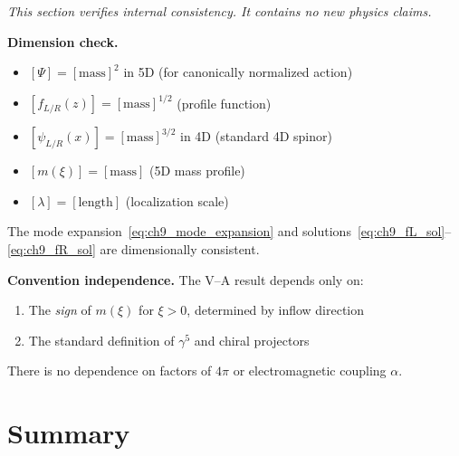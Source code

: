 \begin{tcolorbox}[colback=gray!5!white, colframe=gray!60!black,
    title=\textbf{Consistency Check (Not a Derivation)}]
\emph{This section verifies internal consistency. It contains no new physics claims.}

\medskip
\textbf{Dimension check.}
\begin{itemize}[nosep]
    \item $[\Psi] = [\text{mass}]^2$ in 5D (for canonically normalized action)
    \item $[f_{L/R}(z)] = [\text{mass}]^{1/2}$ (profile function)
    \item $[\psi_{L/R}(x)] = [\text{mass}]^{3/2}$ in 4D (standard 4D spinor)
    \item $[m(\xi)] = [\text{mass}]$ (5D mass profile)
    \item $[\lambda] = [\text{length}]$ (localization scale)
\end{itemize}
The mode expansion~\eqref{eq:ch9_mode_expansion} and solutions~\eqref{eq:ch9_fL_sol}--\eqref{eq:ch9_fR_sol} are dimensionally consistent.

\medskip
\textbf{Convention independence.}
The V–A result depends only on:
\begin{enumerate}[nosep]
    \item The \emph{sign} of $m(\xi)$ for $\xi > 0$, determined by inflow direction
    \item The standard definition of $\gamma^5$ and chiral projectors
\end{enumerate}
There is no dependence on factors of $4\pi$ or electromagnetic coupling $\alpha$.
\end{tcolorbox}

\section{Summary}
\label{sec:ch9_summary}


